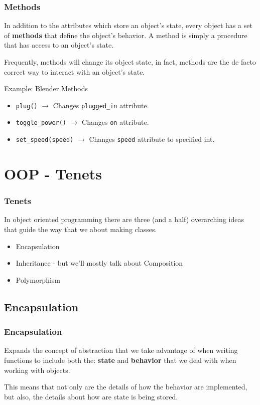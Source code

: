 \documentclass{beamer}
\begin{document}
\begin{frame}
  \frametitle{Methods}
  In addition to the attributes which store an object's state, every object has a set of \textbf{methods} that define the object's behavior. A method is simply a procedure that has access to an object's state. \vspace{2mm}
 \pause 

 Frequently, methods will change its object state, in fact, methods are the de facto correct way to interact with an object's state. \vspace{4mm}
  \pause

  \begin{block}{Example: Blender Methods}
    \begin{itemize}
      \item \texttt{plug()} $\rightarrow$ Changes \texttt{plugged\_in} attribute.
      \item \texttt{toggle\_power()} $\rightarrow$ Changes \texttt{on} attribute.
      \item \texttt{set\_speed(speed)} $\rightarrow$ Changes \texttt{speed} attribute to specified int.
    \end{itemize}
  \end{block}
\end{frame}

\section{OOP - Tenets}
\begin{frame}
  \frametitle{Tenets}
  In object oriented programming there are three (and a half) overarching ideas that guide the way that we about making classes. \vspace{5mm}

  \begin{itemize}
    \item Encapsulation
    \item Inheritance - but we'll mostly talk about Composition
    \item Polymorphism
  \end{itemize}
\end{frame}

\subsection{Encapsulation}
\begin{frame}
  \frametitle{Encapsulation}
  Expands the concept of abstraction that we take advantage of when writing functions to include both the: \textbf{state} and \textbf{behavior} that we deal with when working with objects. \vspace{4mm}
  \pause

  This means that not only are the details of how the behavior are implemented, but also, the details about how are state is being stored.
\end{frame}
\end{document}
